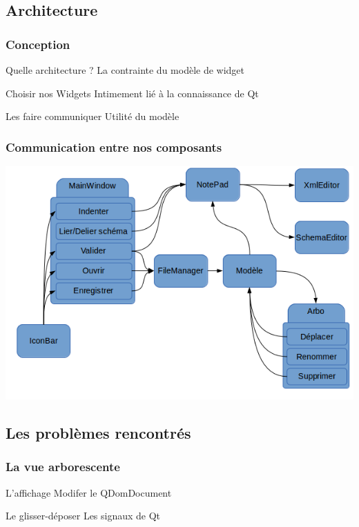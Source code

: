 \documentclass{beamer}
\begin{document}
        \subsection{Architecture}
        \begin{frame}
          \frametitle{Conception}
          \begin{block}{Quelle architecture ?}
            La contrainte du modèle de widget
          \end{block}
          \pause
          \begin{block}{Choisir nos Widgets}
            Intimement lié à la connaissance de Qt
          \end{block}
          \pause
          \begin{block}{Les faire communiquer}
            Utilité du modèle
          \end{block}
          \pause
        \end{frame}
        
        \begin{frame}
          \frametitle{Communication entre nos composants}
          \includegraphics[scale=0.5]{images/communication.png}
        \end{frame}

        \subsection{Les problèmes rencontrés}

        \begin{frame}
          \frametitle{La vue arborescente}
          \begin{block}{L'affichage}
            Modifer le QDomDocument
          \end{block}
          \pause
          \begin{block}{Le glisser-déposer}
            Les signaux de Qt
          \end{block}
        \end{frame}
\end{document}
